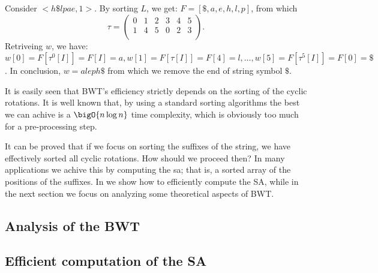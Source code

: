\documentclass{subfiles}
\begin{document}
    \begin{example*}
        Consider \(<h\$ lpae, 1>\).
        By sorting \(L\), we get: \(F = [\$, a, e, h, l, p]\), from which
        \[
            \tau = \begin{pmatrix}
                0 & 1 & 2 & 3 & 4 & 5 \\ 
                1 & 4 & 5 & 0 & 2 & 3 \\ 
            \end{pmatrix}.
        \]
        Retriveing \(w\), we have: \(w[0] = F[\tau^{0}[I]] = F[I] = a, 
        w[1] = F[\tau[I]] = F[4] = l, \dots, w[5] = F[\tau^{5}[I]] = F[0] = \$\).
        In conclusion, \(w = aleph\$\) from which we remove the end of string symbol \(\$\).
    \end{example*}

    \begin{remark*}
        It is easily seen that BWT's efficiency strictly depends on the sorting of 
            the cyclic rotations. It is well known that, by using a standard sorting 
            algorithms the best we can achive is a \(\bigO{n \log n}\) time complexity,
            which is obviously too much for a pre-processing step.

        It can be proved that if we focus on sorting the suffixes of the string,
            we have effectively sorted all cyclic rotations. How should we proceed then?
            In many applications we achive this by computing the \gls{sa}; 
            that is, a sorted array of the positions of the suffixes.
            In  we show how to efficiently compute the SA,
            while in the next section we focus on analyzing some theoretical aspects of BWT.
    \end{remark*}

    \subsection{Analysis of the BWT}
    

    \subsection[The DC3 algorithm]{Efficient computation of the SA}
    
\end{document}
